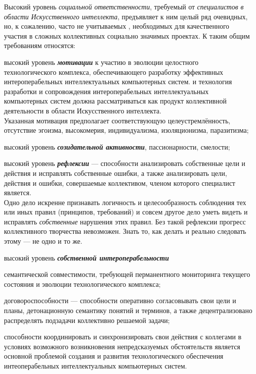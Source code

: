 Высокий уровень \textit{социальной ответственности}, требуемый от \textit{специалистов в области Искусственного интеллекта}, предъявляет к ним целый ряд очевидных, но, к сожалению, часто не учитываемых , необходимых для качественного участия в сложных коллективных социально значимых проектах. К таким общим требованиям относятся:

\begin{textitemize}
	\item  высокий уровень \textbf{\textit{мотивации}} к участию в  эволюции целостного технологического комплекса, обеспечивающего разработку эффективных интероперабельных интеллектуальных компьютерных систем.  и  технология разработки и сопровождения интероперабельных интеллектуальных компьютерных систем должна рассматриваться как  продукт коллективной деятельности в области Искусственного интеллекта.\\
	Указанная мотивация предполагает соответствующую целеустремлённость, отсутствие эгоизма, высокомерия, индивидуализма, изоляционизма, паразитизма;
	\item высокий уровень \textbf{\textit{созидательной активности}}, пассионарности, смелости;
	\item высокий уровень \textbf{\textit{рефлексии}} --- способности анализировать собственные цели и действия и исправлять собственные ошибки, а также анализировать цели, действия и ошибки, совершаемые коллективом, членом которого специалист является.\\
	Одно дело искренне признавать логичность и целесообразность соблюдения тех или иных правил (принципов, требований) и совсем другое дело уметь видеть и исправлять \textit{собственные} нарушения этих правил. Без такой рефлексии прогресс коллективного творчества невозможен. Знать то, как  делать и реально следовать этому --- не одно и то же.
	\item высокий уровень \textbf{\textit{собственной интероперабельности}}
	\begin{textitemize}
		\item семантической совместимости, требующей перманентного мониторинга текущего состояния и эволюции технологического комплекса;
		\item договороспособности --- способности оперативно согласовывать свои цели и планы, детонационную семантику понятий и терминов, а также децентрализовано распределять подзадачи коллективно решаемой задачи;
		\item способности координировать и синхронизировать свои действия с коллегами в условиях возможного возникновения непредсказуемых обстоятельств является основной проблемой создания и развития технологического обеспечения интеоперабельных интеллектуальных компьютерных систем.

\end{textitemize}
\end{textitemize}
